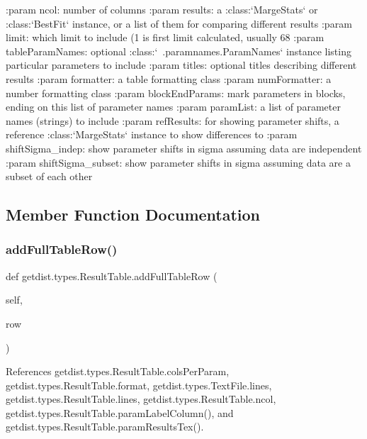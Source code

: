 \begin{DoxyVerb}:param ncol: number of columns
:param results: a :class:`MargeStats` or :class:`BestFit` instance, or a list of them for comparing different results
:param limit: which limit to include (1 is first limit calculated, usually 68%
:param tableParamNames: optional :class:`~.paramnames.ParamNames` instance listing particular parameters to include
:param titles: optional titles describing different results
:param formatter: a table formatting class
:param numFormatter: a number formatting class
:param blockEndParams: mark parameters in blocks, ending on this list of parameter names
:param paramList: a list of parameter names (strings) to include
:param refResults: for showing parameter shifts, a reference :class:`MargeStats` instance to show differences to
:param shiftSigma_indep: show parameter shifts in sigma assuming data are independent
:param shiftSigma_subset: show parameter shifts in sigma assuming data are a subset of each other
\end{DoxyVerb}
 

\subsection{Member Function Documentation}
\mbox{\label{classgetdist_1_1types_1_1ResultTable_aa355a2d81bd343f2b76bd9e0a16a88af}} 
\subsubsection{\texorpdfstring{add\+Full\+Table\+Row()}{addFullTableRow()}}
{\footnotesize\ttfamily def getdist.\+types.\+Result\+Table.\+add\+Full\+Table\+Row (\begin{DoxyParamCaption}\item[{}]{self,  }\item[{}]{row }\end{DoxyParamCaption})}



References getdist.\+types.\+Result\+Table.\+cols\+Per\+Param, getdist.\+types.\+Result\+Table.\+format, getdist.\+types.\+Text\+File.\+lines, getdist.\+types.\+Result\+Table.\+lines, getdist.\+types.\+Result\+Table.\+ncol, getdist.\+types.\+Result\+Table.\+param\+Label\+Column(), and getdist.\+types.\+Result\+Table.\+param\+Results\+Tex().

